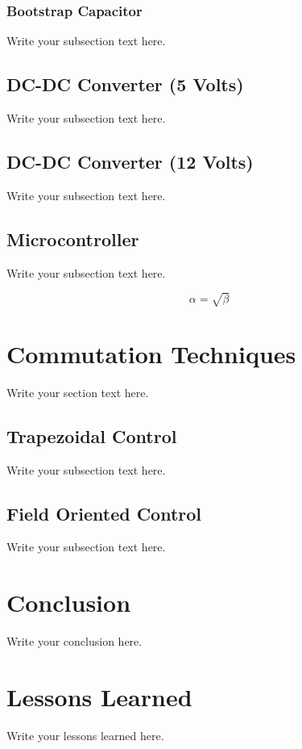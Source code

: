 \documentclass{article}
\begin{document}
		\subsubsection{Bootstrap Capacitor}
		Write your subsection text here.
	
		\subsection{DC-DC Converter (5 Volts)}
		Write your subsection text here.
	
		\subsection{DC-DC Converter (12 Volts)}
		Write your subsection text here.
	
		\subsection{Microcontroller}
		Write your subsection text here.
	
		\begin{equation}
		\label{simple_equation}
		\alpha = \sqrt{ \beta }
		\end{equation}
	
	\section{Commutation Techniques}
	Write your section text here.
	
		\subsection{Trapezoidal Control}
		Write your subsection text here.
		
		\subsection{Field Oriented Control}
		Write your subsection text here.
	
	\section{Conclusion}
	Write your conclusion here.
	
	\section{Lessons Learned}
	Write your lessons learned here.
	
	
\end{document}
